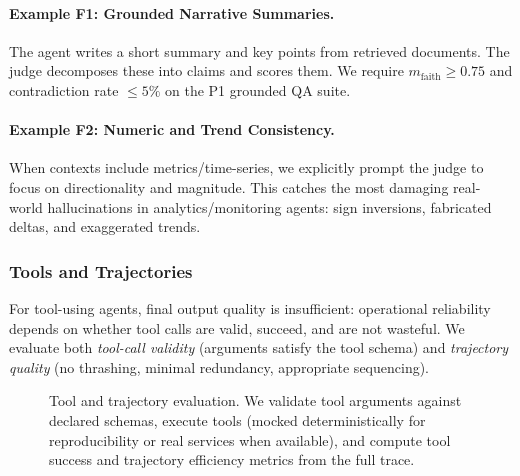 \documentclass[11pt]{article}
\begin{document}
\paragraph{Example F1: Grounded Narrative Summaries.}
The agent writes a short summary and key points from retrieved documents.
The judge decomposes these into claims and scores them.
We require $m_{\text{faith}} \ge 0.75$ and contradiction rate $\le 5\%$ on the P1 grounded QA suite.

\paragraph{Example F2: Numeric and Trend Consistency.}
When contexts include metrics/time-series, we explicitly prompt the judge to focus on directionality and magnitude.
This catches the most damaging real-world hallucinations in analytics/monitoring agents: sign inversions, fabricated deltas, and exaggerated trends.

\subsubsection{Tools and Trajectories}

For tool-using agents, final output quality is insufficient: operational reliability depends on whether tool calls are valid, succeed, and are not wasteful.
We evaluate both \emph{tool-call validity} (arguments satisfy the tool schema) and \emph{trajectory quality} (no thrashing, minimal redundancy, appropriate sequencing).

\begin{figure}[t]
\centering
{}
\caption{Tool and trajectory evaluation.
We validate tool arguments against declared schemas, execute tools (mocked deterministically for reproducibility or real services when available), and compute tool success and trajectory efficiency metrics from the full trace.}
\label{fig:tools-traj}
\end{figure}
\end{document}
